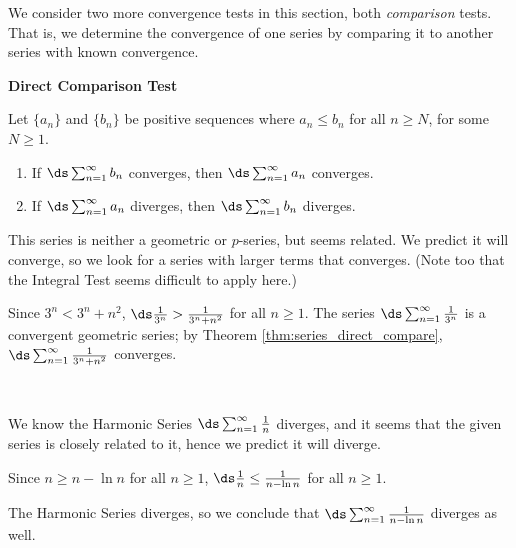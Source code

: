 We consider two more convergence tests in this section, both \textit{comparison} tests. That is, we determine the convergence of one series by  comparing it to another series with known convergence. 
\clearpage

\noindent\textbf{\large Direct Comparison Test}\\

{Let $\{a_n\}$ and $\{b_n\}$ be positive sequences where $a_n\leq b_n$ for all $n\geq N$, for some $N\geq 1$. 
	\begin{enumerate}
		\item If $\ds \sum_{n=1}^\infty b_n$ converges, then $\ds \sum_{n=1}^\infty a_n$ converges.
		\item	If $\ds \sum_{n=1}^\infty a_n$ diverges, then $\ds \sum_{n=1}^\infty b_n$ diverges.
	\end{enumerate}
}


{This series is neither a geometric or $p$-series, but seems related. We predict it will converge, so we look for a series with larger terms that converges. (Note too that the Integral Test seems difficult to apply here.)

Since $3^n < 3^n+n^2$, $\ds \frac1{3^n}> \frac1{3^n+n^2}$ for all $n\geq1$. The series $\ds\sum_{n=1}^\infty \frac{1}{3^n}$ is a convergent geometric series; by Theorem \ref{thm:series_direct_compare}, $\ds \sum_{n=1}^\infty \frac1{3^n+n^2}$ converges.
}\\

{We know the Harmonic Series $\ds\sum_{n=1}^\infty \frac1n$ diverges, and it seems that the given series is closely related to it, hence we predict it will diverge. 

Since $n\geq n-\ln n$ for all $n\geq 1$, $\ds \frac1n \leq \frac1{n-\ln n}$ for all $n\geq 1$. 

The Harmonic Series diverges, so we conclude that $\ds\sum_{n=1}^\infty \frac{1}{n-\ln n}$ diverges as well.
}\\

